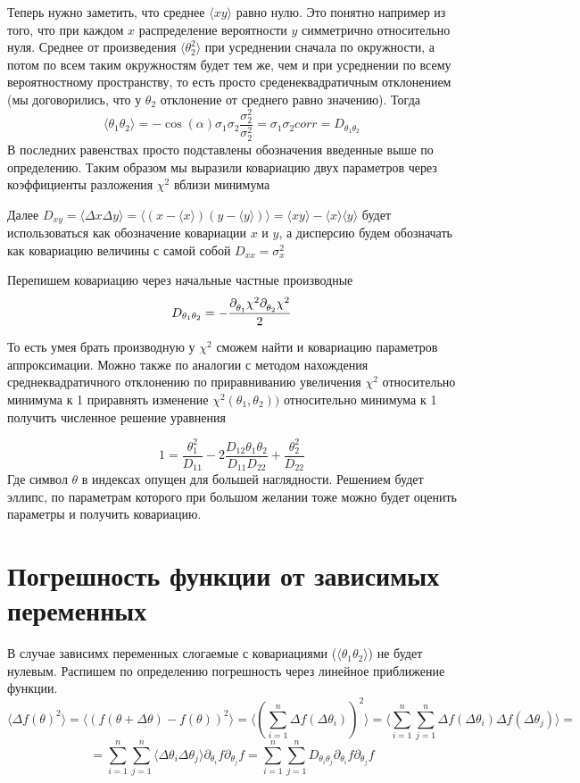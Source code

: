\documentclass[a4paper,12pt]{article}
\renewcommand{\d}[2][ ]{%
\partial^{#1}_{#2}}
\begin{document}
Теперь нужно заметить, что среднее $\langle xy \rangle$ равно нулю. Это понятно например из того,
что при каждом $x$ распределение вероятности $y$ симметрично относительно нуля.
Среднее от произведения $\langle \theta_2^2\rangle$ при усреднении сначала по окружности, а потом
по всем таким окружностям будет тем же, чем и при усреднении по всему вероятностному пространству, то есть
просто среденеквадратичным отклонением (мы договорились, что у $\theta_2$ отклонение от среднего равно значению).
Тогда
\[ \langle \theta_1\theta_2\rangle = -\cos(\alpha)\sigma_1\sigma_2 \frac{\sigma_2^2}{\sigma_2^2} =
\sigma_1\sigma_2 corr = D_{\theta_1\theta_2} \]
В последних равенствах просто подставлены обозначения введенные выше по определению.
Таким образом мы выразили ковариацию двух параметров через коэффициенты разложения $\chi^2$ вблизи минимума

Далее $D_{xy} = \langle \Delta x \Delta y \rangle = \langle (x-\langle x\rangle)(y-\langle y\rangle) \rangle = \langle xy\rangle - \langle x\rangle \langle y \rangle$ будет использоваться как обозначение ковариации $x$ и $y$,
а дисперсию будем обозначать как ковариацию величины с самой собой $D_{xx} = \sigma_x^2$

Перепишем ковариацию через начальные частные производные
\[  D_{\theta_1\theta_2} = -\frac{\d{\theta_1}\chi^2 \d{\theta_2}\chi^2}{2} \]

То есть умея брать производную у $\chi^2$ сможем найти и ковариацию параметров аппроксимации. Можно также по
аналогии с методом нахождения среднеквадратичного отклонению по приравниванию увеличения $\chi^2$ относительно
минимума к 1 приравнять изменение $\chi^2(\theta_1, \theta_2))$ относительно минимума к 1 получить численное решение уравнения

\[1 =
\frac{\theta_1^2}{D_{11}} - 2 \frac{D_{12}\theta_1\theta_2}{D_{11} D_{22}} + \frac{\theta_2^2}{D_{22}}\]
Где символ $\theta$ в индексах опущен для большей наглядности. Решением будет эллипс, по параметрам которого при большом
желании тоже можно будет оценить параметры и получить ковариацию.

\section{Погрешность функции от зависимых переменных}

В случае зависимх переменных  слогаемые с ковариациями ($\langle \theta_1\theta_2\rangle$)
не будет нулевым. Распишем по определению погрешность через линейное приближение функции.
\[ \langle \Delta f(\theta)^2 \rangle = 
\langle (f(\theta + \Delta \theta)-f(\theta))^2\rangle
= \langle (\sum_{i=1}^{n} \Delta f(\Delta \theta_i))^2\rangle
= \langle \sum_{i=1}^{n}\sum_{j=1}^{n} \Delta f(\Delta \theta_i)\Delta f(\Delta \theta_j) \rangle =\]
\[= \sum_{i=1}^{n}\sum_{j=1}^{n} \langle\Delta\theta_i \Delta\theta_j \rangle \d{\theta_i} f \d{\theta_j} f 
= \sum_{i=1}^{n}\sum_{j=1}^{n} D_{\theta_i\theta_j} \d{\theta_i} f \d{\theta_j} f \]
\end{document}
